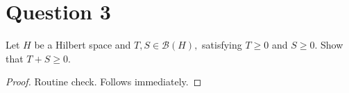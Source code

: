 \section{Question 3}
\horz

Let $H$ be a Hilbert space and $T, S\in \mathcal B(H),$ satisfying $T\geqslant 0$ and $S\geqslant 0.$ Show that $T+S \geqslant 0.$

\horz

\begin{proof}
    Routine check. Follows immediately.
\end{proof}
